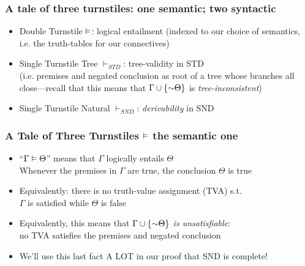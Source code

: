 \begin{frame}
\frametitle{A tale of three turnstiles: one semantic; two syntactic}

\begin{itemize}[<+->]

\item Double Turnstile $\vDash$: logical entailment (indexed to our choice of semantics, i.e. the truth-tables for our connectives)

\item Single Turnstile Tree $\vdash_{STD}$: tree-validity in STD \\ (i.e. premises and negated conclusion as root of a tree whose branches all close---recall that this means that $\Gamma \cup \{\enot \Theta\}$ is \emph{tree-inconsistent}) %

\item Single Turnstile Natural $\vdash_{SND}$: \emph{derivability} in SND

\end{itemize}
\end{frame}

\begin{frame}
\frametitle{A Tale of Three Turnstiles $\vDash$ the semantic one}

\begin{itemize}[<+->]


\item ``$\Gamma \vDash \Theta$'' means that $\Gamma$ logically entails $\Theta$ \\ Whenever the premises in $\Gamma$ are true, the conclusion $\Theta$ is true 

\item Equivalently: there is no truth-value assignment (TVA) s.t. \\ $\Gamma$ is satisfied while $\Theta$ is false

\item Equivalently, this means that \emph{$\Gamma \cup \{\enot \Theta\}$ is unsatisfiable}: \\ no TVA satisfies the premises and negated conclusion  

\item We'll use this last fact A LOT in our proof that SND is complete! %

\end{itemize}
\end{frame}


